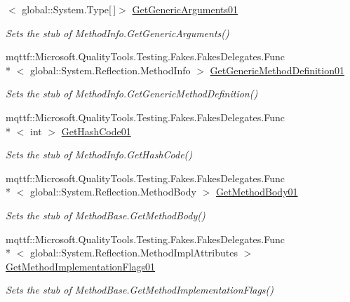 \begin{DoxyCompactItemize}
$<$ global\-::\-System.\-Type\mbox{[}$\,$\mbox{]}$>$ \hyperlink{class_system_1_1_reflection_1_1_fakes_1_1_stub_method_info_a6274320a30c47d4e216425231f2afd9a}{Get\-Generic\-Arguments01}
\begin{DoxyCompactList}\small\item\em Sets the stub of Method\-Info.\-Get\-Generic\-Arguments()\end{DoxyCompactList}\item 
mqttf\-::\-Microsoft.\-Quality\-Tools.\-Testing.\-Fakes.\-Fakes\-Delegates.\-Func\\*
$<$ global\-::\-System.\-Reflection.\-Method\-Info $>$ \hyperlink{class_system_1_1_reflection_1_1_fakes_1_1_stub_method_info_a2c0c76a2e7ef1925ac5c56bf10a12ea0}{Get\-Generic\-Method\-Definition01}
\begin{DoxyCompactList}\small\item\em Sets the stub of Method\-Info.\-Get\-Generic\-Method\-Definition()\end{DoxyCompactList}\item 
mqttf\-::\-Microsoft.\-Quality\-Tools.\-Testing.\-Fakes.\-Fakes\-Delegates.\-Func\\*
$<$ int $>$ \hyperlink{class_system_1_1_reflection_1_1_fakes_1_1_stub_method_info_ac1d35bf1a0a558a6a5023c8cd7850f1e}{Get\-Hash\-Code01}
\begin{DoxyCompactList}\small\item\em Sets the stub of Method\-Info.\-Get\-Hash\-Code()\end{DoxyCompactList}\item 
mqttf\-::\-Microsoft.\-Quality\-Tools.\-Testing.\-Fakes.\-Fakes\-Delegates.\-Func\\*
$<$ global\-::\-System.\-Reflection.\-Method\-Body $>$ \hyperlink{class_system_1_1_reflection_1_1_fakes_1_1_stub_method_info_acdf100453c96cc01e5f731a51a4fb8d9}{Get\-Method\-Body01}
\begin{DoxyCompactList}\small\item\em Sets the stub of Method\-Base.\-Get\-Method\-Body()\end{DoxyCompactList}\item 
mqttf\-::\-Microsoft.\-Quality\-Tools.\-Testing.\-Fakes.\-Fakes\-Delegates.\-Func\\*
$<$ global\-::\-System.\-Reflection.\-Method\-Impl\-Attributes $>$ \hyperlink{class_system_1_1_reflection_1_1_fakes_1_1_stub_method_info_ac73fa250a93d442e4e24fccd4d641e1a}{Get\-Method\-Implementation\-Flags01}
\begin{DoxyCompactList}\small\item\em Sets the stub of Method\-Base.\-Get\-Method\-Implementation\-Flags()\end{DoxyCompactList}\item 

\end{DoxyCompactItemize}
